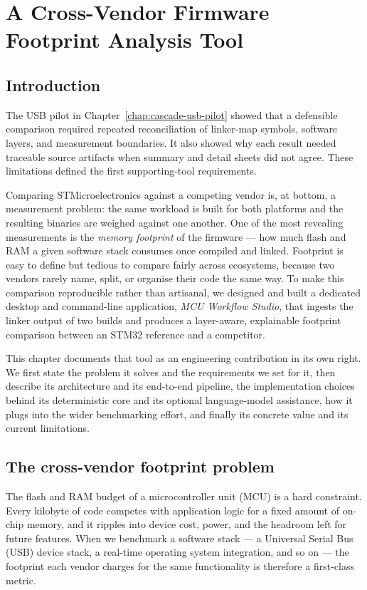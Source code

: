 \chapter{A Cross-Vendor Firmware Footprint Analysis Tool}
\label{chap:footprint-tool}

\section*{Introduction}

The USB pilot in Chapter~\ref{chap:cascade-usb-pilot} showed that a defensible comparison
required repeated reconciliation of linker-map symbols, software layers, and measurement
boundaries. It also showed why each result needed traceable source artifacts when summary
and detail sheets did not agree. These limitations defined the first supporting-tool
requirements.

Comparing STMicroelectronics against a competing vendor is, at bottom, a measurement
problem: the same workload is built for both platforms and the resulting binaries are
weighed against one another. One of the most revealing measurements is the
\emph{memory footprint} of the firmware --- how much flash and RAM a given software stack
consumes once compiled and linked. Footprint is easy to define but tedious to compare
fairly across ecosystems, because two vendors rarely name, split, or organise their code
the same way. To make this comparison reproducible rather than artisanal, we designed and
built a dedicated desktop and command-line application, \emph{MCU Workflow Studio}, that
ingests the linker output of two builds and produces a layer-aware, explainable footprint
comparison between an STM32 reference and a competitor.

This chapter documents that tool as an engineering contribution in its own right. We first
state the problem it solves and the requirements we set for it, then describe its
architecture and its end-to-end pipeline, the implementation choices behind its
deterministic core and its optional language-model assistance, how it plugs into the wider
benchmarking effort, and finally its concrete value and its current limitations.

\section{The cross-vendor footprint problem}
\label{sec:tool-problem}

The flash and RAM budget of a microcontroller unit (MCU) is a hard constraint. Every
kilobyte of code competes with application logic for a fixed amount of on-chip memory, and
it ripples into device cost, power, and the headroom left for future features. When we
benchmark a software stack --- a Universal Serial Bus (USB) device stack, a real-time
operating system integration, and so on --- the footprint each vendor charges for the same
functionality is
therefore a first-class metric.

